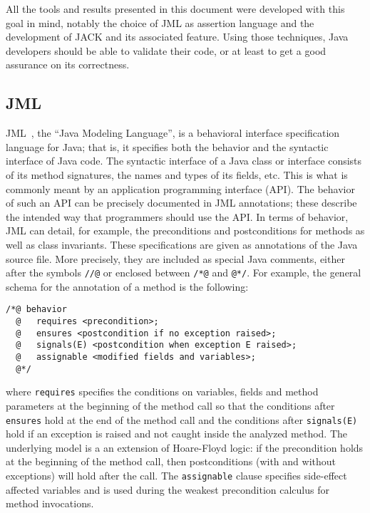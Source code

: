 All the tools and results presented in this document were developed
with this goal in mind, notably the choice of JML as assertion
language and the development of JACK and its associated feature.
Using those techniques, Java developers should be able to validate
their code, or at least to get a good assurance on its correctness.


\subsection{JML}
JML~\cite{Leavens-Baker-Ruby99b,Leavens-Baker-Ruby03}, the ``Java
Modeling Language'', is a behavioral interface specification language
for Java; that is, it specifies both the behavior and the syntactic
interface of Java code.  The syntactic interface of a Java class or
interface consists of its method signatures, the names and types of
its fields, etc.  This is what is commonly meant by an application
programming interface (API).  The behavior of such an API can be
precisely documented in JML annotations; these describe the intended
way that programmers should use the API.  In terms of behavior, JML
can detail, for example, the preconditions and postconditions for
methods as well as class invariants. These specifications are given as
annotations of the Java source file. More precisely, they are included
as special Java comments, either after the symbols \lstinline!//@! or
enclosed between \lstinline!/*@! and
\lstinline[basicstyle=\normalfont\ttfamily\small\sl]!@*/!. For example,
the general schema for the annotation of a method is the following:
\begin{lstlisting}
/*@ behavior
  @   requires <precondition>;
  @   ensures <postcondition if no exception raised>;
  @   signals(E) <postcondition when exception E raised>;
  @   assignable <modified fields and variables>;
  @*/
\end{lstlisting}
where \lstinline!requires! specifies the conditions on variables, fields
and method parameters at the beginning of the method call so that the
conditions after \lstinline!ensures! hold at the end of the method
call and the conditions after \lstinline!signals(E)! hold if an
exception is raised and not caught inside the analyzed method.  The
underlying model is a an extension of Hoare-Floyd logic: if the
precondition holds at the beginning of the method call, then
postconditions (with and without exceptions) will hold after the
call. The \lstinline!assignable! clause specifies side-effect affected
variables and is used during the weakest precondition calculus for
method invocations.

